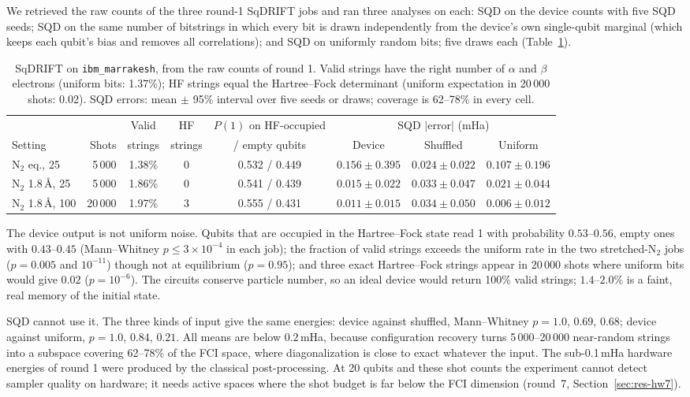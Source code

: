 \documentclass[11pt,a4paper]{article}
\begin{document}
We retrieved the raw counts of the three round-1 SqDRIFT jobs and ran three
analyses on each: SQD on the device counts with five SQD seeds; SQD on the
same number of bitstrings in which every bit is drawn independently from the
device's own single-qubit marginal (which keeps each qubit's bias and
removes all correlations); and SQD on uniformly random bits; five draws each
(Table~\ref{tab:hw-sqd}).

\begin{table}[H]
\centering\footnotesize\setlength{\tabcolsep}{4pt}
\begin{tabular}{lrcccccc}
\toprule
 & & Valid & HF & $P(1)$ on HF-occupied & \multicolumn{3}{c}{SQD $|$error$|$ (mHa)} \\
Setting & Shots & strings & strings & / empty qubits & Device & Shuffled & Uniform \\
\midrule
N$_2$ eq., 25 & 5\,000 & 1.38\% & 0 & 0.532 / 0.449 & $0.156 \pm 0.395$ & $0.024 \pm 0.022$ & $0.107 \pm 0.196$ \\
N$_2$ 1.8\,\AA, 25 & 5\,000 & 1.86\% & 0 & 0.541 / 0.439 & $0.015 \pm 0.022$ & $0.033 \pm 0.047$ & $0.021 \pm 0.044$ \\
N$_2$ 1.8\,\AA, 100 & 20\,000 & 1.97\% & 3 & 0.555 / 0.431 & $0.011 \pm 0.015$ & $0.034 \pm 0.050$ & $0.006 \pm 0.012$ \\
\bottomrule
\end{tabular}
\caption{SqDRIFT on \texttt{ibm\_marrakesh}, from the raw counts of round 1.
Valid strings have the right number of $\alpha$ and $\beta$ electrons
(uniform bits: 1.37\%); HF strings equal the Hartree--Fock determinant
(uniform expectation in 20\,000 shots: 0.02). SQD errors: mean $\pm$ 95\%
interval over five seeds or draws; coverage is 62--78\% in every cell.}
\label{tab:hw-sqd}
\end{table}

The device output is not uniform noise. Qubits that are occupied in the
Hartree--Fock state read 1 with probability $0.53$--$0.56$, empty ones with
$0.43$--$0.45$ (Mann--Whitney $p \le 3\times10^{-4}$ in each job); the
fraction of valid strings exceeds the uniform rate in the two stretched-N$_2$
jobs ($p = 0.005$ and $10^{-11}$) though not at equilibrium ($p = 0.95$);
and three exact Hartree--Fock strings appear in 20\,000 shots where uniform
bits would give $0.02$ ($p = 10^{-6}$). The circuits conserve particle
number, so an ideal device would return 100\% valid strings; $1.4$--$2.0\%$
is a faint, real memory of the initial state.

SQD cannot use it. The three kinds of input give the same energies: device
against shuffled, Mann--Whitney $p = 1.0$, $0.69$, $0.68$; device against
uniform, $p = 1.0$, $0.84$, $0.21$. All means are below $0.2$\,mHa, because
configuration recovery turns 5\,000--20\,000 near-random strings into a
subspace covering 62--78\% of the FCI space, where diagonalization is close
to exact whatever the input. The sub-0.1\,mHa hardware energies of round 1
were produced by the classical post-processing. At 20 qubits and these shot
counts the experiment cannot detect sampler quality on hardware; it needs
active spaces where the shot budget is far below the FCI dimension
(round~7, Section~\ref{sec:res-hw7}).
\end{document}
